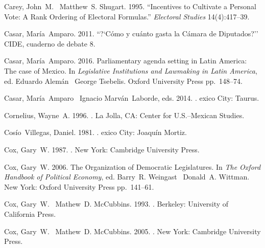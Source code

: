 \documentclass[letter,12pt]{article}
\begin{document}
\begin{thebibliography}{xx}
Carey, John~M. \harvardand\ Matthew~S. Shugart. 1995.
\newblock ``Incentives to Cultivate a Personal Vote: A Rank Ordering of
  Electoral Formulas.'' {\em Electoral Studies} 14(4):417--39.

Casar, Mar\'ia~Amparo. 2011.
\newblock ``?`C\'omo y cu\'anto gasta la {C\'a}mara de {D}iputados?'' CIDE,
  cuaderno de debate 8.

Casar, Mar\'ia~Amparo. 2016.
\newblock Parliamentary agenda setting in {L}atin {A}merica: The case of
  {M}exico.  In {\em Legislative Institutions and Lawmaking in {L}atin
  {A}merica}, ed. Eduardo Alem\'an \harvardand\ George Tsebelis.
\newblock Oxford University Press pp.~148--74.

Casar, Mar\'ia~Amparo \harvardand\ Ignacio Marv\'an~Laborde, eds. 2014.
.
exico City:  Taurus.

Cornelius, Wayne~A. 1996.
.
\newblock La Jolla, CA:  Center for U.S.--Mexican Studies.

Cos\'io~Villegas, Daniel. 1981.
.
exico City:  Joaqu\'in Mortiz.

Cox, Gary~W. 1987.
.
\newblock New York:  Cambridge University Press.

Cox, Gary~W. 2006.
\newblock The Organization of Democratic Legislatures.  In {\em The Oxford
  Handbook of Political Economy}, ed. Barry~R. Weingast \harvardand\ Donald~A.
  Wittman.
\newblock New York:  Oxford University Press pp.~141--61.

Cox, Gary~W. \harvardand\ Mathew~D. McCubbins. 1993.
.
\newblock Berkeley:  University of California Press.

Cox, Gary~W. \harvardand\ Mathew~D. McCubbins. 2005.
.
\newblock New York:  Cambridge University Press.


\end{thebibliography}
\end{document}
